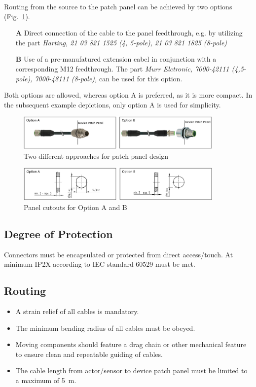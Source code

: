 \documentclass[english]{psi_easy}
\begin{document}
Routing from the source to the patch panel can be achieved by two options (Fig.~\ref{fig:PatchingOptions}).
\begin{itemize}
    \item[\bf A] Direct connection of the cable to the panel feedthrough, e.g. by utilizing the part \emph{Harting, 21 03 821 1525 (4, 5-pole), 21 03 821 1825 (8-pole)}
    \item[\bf B] Use of a pre-manufatured extension cabel in conjunction with a corresponding M12 feedthrough. The part \emph{Murr Elctronic, 7000-42111 (4,5-pole), 7000-48111 (8-pole), } can be used for this option.
\end{itemize}
Both options are allowed, whereas option A is preferred, as it is more compact.
In the subsequent example depictions, only option A is used for simplicity.

\begin{figure}[H]
\centering
\includegraphics[width=0.9\textwidth]{Figures/PatchingOptions.jpg}
\caption{\label{fig:PatchingOptions}Two different approaches for patch panel design}
\end{figure}


\begin{figure}[H]
\centering
\includegraphics[width=0.9\textwidth]{Figures/PanelCutOut.jpg}
\caption{\label{fig:PanelCutOut}Panel cutouts for Option A and B}
\end{figure}

\subsection{Degree of Protection}
Connectors must be encapsulated or protected from direct access/touch. At minimum IP2X according to IEC standard 60529 must be met.

\subsection{Routing}
\begin{itemize}
    \item A strain relief of all cables is mandatory.
    \item The minimum bending radius of all cables must be obeyed.
    \item Moving components should feature a drag chain or other mechanical feature to ensure clean and repeatable guiding of cables.
    \item The cable length from actor/sensor to device patch panel must be limited to a maximum of 5~m.
\end{itemize}
\end{document}
